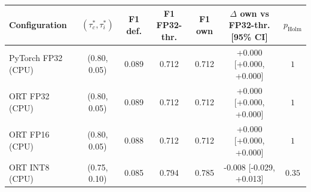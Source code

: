 \begin{tabular}{lcccccc}
\toprule
\textbf{Configuration} & $(\tau_c^*, \tau_i^*)$ & \textbf{F1 def.} & \textbf{F1 FP32-thr.} & \textbf{F1 own} & \textbf{$\Delta$ own vs FP32-thr. [95\% CI]} & \textbf{$p_{\text{Holm}}$} \\
\midrule
PyTorch FP32 (CPU) & (0.80, 0.05) & 0.089 & 0.712 & 0.712 & +0.000 [+0.000, +0.000] & $1$ \\
ORT FP32 (CPU) & (0.80, 0.05) & 0.089 & 0.712 & 0.712 & +0.000 [+0.000, +0.000] & $1$ \\
ORT FP16 (CPU) & (0.80, 0.05) & 0.088 & 0.712 & 0.712 & +0.000 [+0.000, +0.000] & $1$ \\
ORT INT8 (CPU) & (0.75, 0.10) & 0.085 & 0.794 & 0.785 & -0.008 [-0.029, +0.013] & $0.35$ \\
\bottomrule
\end{tabular}

